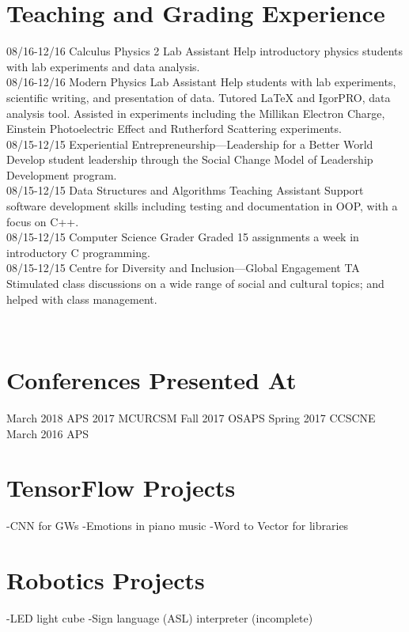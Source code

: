 \documentclass[]{friggeri-cv}
\begin{document}
\section{Teaching and Grading Experience}
\begin{entrylist}
  \entry
    {08/16-12/16}
    {Calculus Physics 2 Lab Assistant}
    {}
    {Help introductory physics students with lab experiments and data analysis.\\}
  \entry
    {08/16-12/16}
    {Modern Physics Lab Assistant}
    {}
    {Help students with lab experiments, scientific writing, and presentation of data. Tutored LaTeX and IgorPRO, data analysis tool. Assisted in experiments including the Millikan Electron Charge, Einstein Photoelectric Effect and Rutherford Scattering experiments.\\}
    \entry
    {08/15-12/15}
    {Experiential Entrepreneurship—Leadership for a Better World}
    {}
    {Develop student leadership through the Social Change Model of Leadership Development program.\\}
  \entry
    {08/15-12/15}
    {Data Structures and Algorithms Teaching Assistant}
    {}
    {Support software development skills including testing and documentation in OOP, with a focus on C++.\\}
    \entry
    {08/15-12/15}
    {Computer Science Grader}
    {}
    {Graded 15 assignments a week in introductory C programming. \\}
    \entry
    {08/15-12/15}
    {Centre for Diversity and Inclusion—Global Engagement TA}
    {}
    {Stimulated class discussions on a wide range of social and cultural topics; and helped with class management. \\}
\end{entrylist}
\newpage


\begin{aside}
~
~
~
~
\section{Conferences Presented At}
March 2018 APS
2017 MCURCSM
Fall 2017 OSAPS
Spring 2017 CCSCNE
March 2016 APS
~
~
~
~
~
~
~
~
~~~~~~~~~
\section{TensorFlow Projects}
-CNN for GWs
-Emotions in piano music
-Word to Vector for libraries
~
~
~
\section{Robotics Projects}
-LED light cube
-Sign language (ASL)
interpreter (incomplete)
\end{aside}
\end{document}
